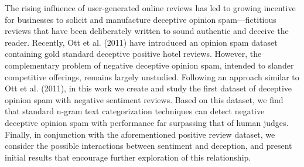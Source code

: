 The rising influence of user-generated online reviews has led to growing incentive for businesses to solicit and manufacture deceptive opinion
 spam---fictitious reviews that have been deliberately written to sound
 authentic and deceive the reader. Recently, Ott et al. (2011) have introduced
 an opinion spam dataset containing gold standard deceptive positive hotel
 reviews. However, the complementary problem of negative deceptive opinion spam,
 intended to slander competitive offerings, remains largely unstudied. Following
 an approach similar to Ott et al. (2011), in this work we create and study the
 first dataset of deceptive opinion spam with negative sentiment reviews. Based
 on this dataset, we find that standard n-gram text categorization techniques
 can detect negative deceptive opinion spam with performance far surpassing that
 of human judges. Finally, in conjunction with the aforementioned positive
 review dataset, we consider the possible interactions between sentiment and
 deception, and present initial results that encourage further exploration of
 this relationship.

